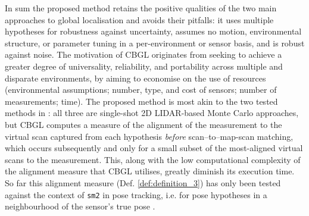 In sum the proposed method retains the positive qualities of the two main approaches to global
localisation and avoids their pitfalls: it uses multiple hypotheses for
robustness against uncertainty, assumes no motion, environmental structure, or
parameter tuning in a per-environment or sensor basis, and is robust against
noise.
The motivation of CBGL originates from seeking to achieve a
greater degree of universality, reliability, and portability across multiple
and disparate environments, by aiming to economise on the use of resources
(environmental assumptions; number, type, and cost of sensors; number of
measurements; time). The proposed method is most akin to the two tested
methods in \cite{Filotheou2022g}: all three are single-shot 2D LIDAR-based
Monte Carlo approaches, but CBGL computes a measure of the alignment of the
measurement to the virtual scan captured from each hypothesis
\textit{before} scan--to--map-scan matching, which occurs subsequently and only
for a small subset of the most-aligned virtual scans to the measurement. This,
along with the low computational complexity of the alignment measure that CBGL
utilises, greatly diminish its execution time. So far this alignment measure
(Def.  \ref{def:definition_3}) has only been tested against the context of
\texttt{sm2} in pose tracking, i.e. for pose hypotheses in a neighbourhood of
the sensor's true pose%
\cite{Filotheou2022f,Filotheou2023a}.
